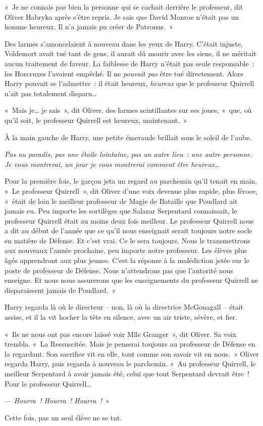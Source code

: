 «~Je ne connais pas bien la personne qui se cachait derrière le professeur, dit Oliver Habryka après s'être repris.
Je sais que David Monroe n'était pas un homme heureux.
Il n'a jamais pu créer de Patronus.~»

Des larmes s'amoncelaient à nouveau dans les yeux de Harry.
C'était injuste, Voldemort avait tué tant de gens, il aurait dû mourir avec les siens, il ne méritait aucun traitement de faveur.
La faiblesse de Harry n'était pas seule responsable~: les Horcruxes l'avaient empêché.
Il ne \emph{pouvait pas} être tué directement.
Alors Harry pouvait se l'admettre~: il était heureux, \emph{heureux} que le professeur Quirrell n'ait pas totalement disparu…

«~Mais je… je sais~», dit Oliver, des larmes scintillantes sur ses joues, «~que, où qu'il soit, le professeur Quirrell est heureux, maintenant.~»

À la main gauche de Harry, une petite émeraude brillait sous le soleil de l'aube.

\emph{Pas au paradis, pas une étoile lointaine, pas un autre lieu~: une autre personne.
Je vous montrerai, un jour je vous montrerai comment être heureux…}

Pour la première fois, le garçon jeta un regard au parchemin qu'il tenait en main.
«~Le professeur Quirrell~», dit Oliver d'une voix devenue plus rapide, plus féroce, «~était de loin le meilleur professeur de Magie de Bataille que Poudlard ait jamais eu.
Peu importe les sortilèges que Salazar Serpentard connaissait, le professeur Quirrell était au moins deux fois meilleur.
Le professeur Quirrell nous a dit au début de l'année que ce qu'il nous enseignait serait toujours notre socle en matière de Défense.
Et c'est vrai.
Ce le sera toujours.
Nous le transmettrons aux nouveaux l'année prochaine, peu importe notre professeur.
Les élèves plus âgés apprendront aux plus jeunes.
C'est la réponse à la malédiction jetée sur le poste de professeur de Défense.
Nous n'attendrons pas que l'autorité nous enseigne.
Et nous nous assurerons que les enseignements du professeur Quirrell ne disparaissent jamais de Poudlard.~»

Harry regarda là où le directeur -- non, là où la directrice McGonagall -- était assise, et il la vit hocher la tête en silence, avec un air triste, sévère, et fier.

«~Ils ne nous ont pas encore laissé voir Mlle Granger~», dit Oliver.
Sa voix trembla.
«~La Ressuscitée.
Mais je penserai toujours au professeur de Défense en la regardant.
Son sacrifice vit en elle, tout comme son savoir vit en nous.~»
Oliver regarda Harry, puis regarda à nouveau le parchemin.
«~Au professeur Quirrell, le meilleur Serpentard à avoir jamais été, celui que tout Serpentard devrait être~!
Pour le professeur Quirrell…

--- \emph{Hourra~!
Hourra~!
Hourra~!}~»

Cette fois, pas un seul élève ne se tut.
